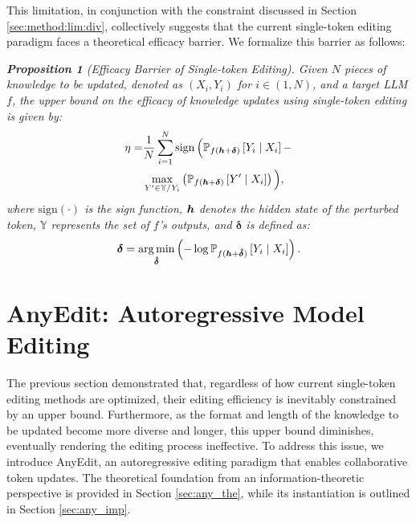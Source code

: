 This limitation, in conjunction with the constraint discussed in Section \ref{sec:method:lim:div}, collectively suggests that the current single-token editing paradigm faces a theoretical efficacy barrier. We formalize this barrier as follows:

\textit{\textbf{Proposition 1} (Efficacy Barrier of Single-token Editing).
Given $N$ pieces of knowledge to be updated, denoted as $(X_i, Y_i)$ for $i \in (1, N)$, and a target LLM $f$, the upper bound on the efficacy of knowledge updates using single-token editing is given by:}
\begin{equation}
\begin{aligned}
\eta= & \frac{1}{N}\sum_{i=1}^N \operatorname{sign}\Big( 
\mathbb{P}_{f({\bm{h}}+\bm{\delta})}\left[Y_i\mid X_i\right]-
\\
&
\max _{Y^{\prime}\in \mathbb{Y}/Y_i} \left(\mathbb{P}_{f({\bm{h}}+\bm{\delta})} \left[Y' \mid X_i\right]\right)\Big),
\end{aligned}
\end{equation}
\textit{where $\text{sign}(\cdot)$ is the sign function, ${\bm{h}}$ denotes the hidden state of the perturbed token, $\mathbb{Y}$ represents the set of $f$'s outputs, and $\bm{\delta}$ is defined as:}
\begin{equation}
    \bm{\delta}= \operatorname*{arg\,min}_{\bm{\hat{\delta}}} \left( -\log \mathbb{P}_{f({\bm{h}}+\bm{\hat{\delta}})} \left[Y_i \mid X_i\right] \right).
\end{equation}

\section{AnyEdit: Autoregressive Model Editing} \label{sec:anyedit}
The previous section demonstrated that, regardless of how current single-token editing methods are optimized, their editing efficiency is inevitably constrained by an upper bound. Furthermore, as the format and length of the knowledge to be updated become more diverse and longer, this upper bound diminishes, eventually rendering the editing process ineffective.
To address this issue, we introduce AnyEdit, an autoregressive editing paradigm that enables collaborative token updates. The theoretical foundation from an information-theoretic perspective is provided in Section \ref{sec:any_the}, while its instantiation is outlined in Section \ref{sec:any_imp}.

